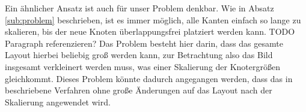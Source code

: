 Ein ähnlicher Ansatz ist auch für unser Problem denkbar. Wie in Absatz \ref{sub:problem} beschrieben, ist es immer möglich, alle Kanten einfach so lange zu skalieren, bis der neue Knoten überlappungsfrei platziert werden kann. TODO Paragraph referenzieren? Das Problem besteht hier darin, dass das gesamte Layout hierbei beliebig groß werden kann, zur Betrachtung also das Bild insgesamt verkleinert werden muss, was einer Skalierung der Knotergrößen gleichkommt. Dieses Problem könnte dadurch angegangen werden, dass das in \cite{wu2011semantic} beschriebene Verfahren ohne große Änderungen auf das Layout nach der Skalierung angewendet wird.
